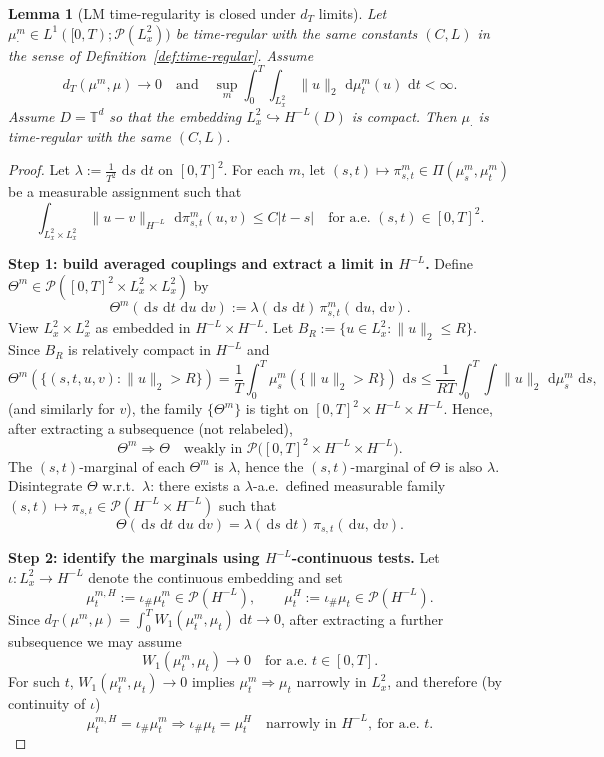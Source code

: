 \documentclass{article}
\numberwithin{equation}{section}
\theoremstyle{plain}
\newtheorem{lemma}[theorem]{Lemma}
\theoremstyle{definition}
\theoremstyle{remark}
\newcommand{\T}{\mathbb{T}}
\newcommand{\Pcal}{\mathcal{P}}
\newcommand{\dd}{\,\mathrm{d}}
\begin{document}
\begin{lemma}[LM time-regularity is closed under $d_T$ limits]
\label{lem:time-reg-closed}
Let $\mu^m_\cdot\in L^1([0,T);\Pcal(L^2_x))$ be time-regular with the same constants $(C,L)$ in the sense of
Definition~\ref{def:time-regular}. Assume
\[
d_T(\mu^m,\mu)\to 0
\quad\text{and}\quad
\sup_m\int_0^T\int_{L^2_x}\|u\|_2\,\dd\mu^m_t(u)\,\dd t<\infty.
\]
Assume $D=\T^d$ so that the embedding $L^2_x\hookrightarrow H^{-L}(D)$ is compact.
Then $\mu_\cdot$ is time-regular with the same $(C,L)$.
\end{lemma}

\begin{proof}
Let $\lambda:=\frac{1}{T^2}\,\dd s\,\dd t$ on $[0,T]^2$.
For each $m$, let $(s,t)\mapsto\pi^m_{s,t}\in\Pi(\mu^m_s,\mu^m_t)$ be a measurable assignment such that
\[
\int_{L^2_x\times L^2_x}\|u-v\|_{H^{-L}}\,\dd\pi^m_{s,t}(u,v)\le C|t-s|
\quad\text{for a.e.\ }(s,t)\in[0,T]^2.
\]

\smallskip
\noindent\textbf{Step 1: build averaged couplings and extract a limit in $H^{-L}$.}
Define $\Theta^m\in\Pcal([0,T]^2\times L^2_x\times L^2_x)$ by
\[
\Theta^m(\dd s\,\dd t\,\dd u\,\dd v)
:=\lambda(\dd s\,\dd t)\,\pi^m_{s,t}(\dd u,\dd v).
\]
View $L^2_x\times L^2_x$ as embedded in $H^{-L}\times H^{-L}$.
Let $B_R:=\{u\in L^2_x:\|u\|_2\le R\}$. Since $B_R$ is relatively compact in $H^{-L}$ and
\[
\Theta^m(\{(s,t,u,v):\|u\|_2>R\})
=\frac1T\int_0^T \mu^m_s(\{\|u\|_2>R\})\,\dd s
\le \frac{1}{RT}\int_0^T\int\|u\|_2\,\dd\mu^m_s\,\dd s,
\]
(and similarly for $v$), the family $\{\Theta^m\}$ is tight on $[0,T]^2\times H^{-L}\times H^{-L}$.
Hence, after extracting a subsequence (not relabeled),
\[
\Theta^m\Rightarrow\Theta
\quad\text{weakly in }\Pcal\big([0,T]^2\times H^{-L}\times H^{-L}\big).
\]
The $(s,t)$-marginal of each $\Theta^m$ is $\lambda$, hence the $(s,t)$-marginal of $\Theta$ is also $\lambda$.
Disintegrate $\Theta$ w.r.t.\ $\lambda$:
there exists a $\lambda$-a.e.\ defined measurable family $(s,t)\mapsto\pi_{s,t}\in\Pcal(H^{-L}\times H^{-L})$ such that
\[
\Theta(\dd s\,\dd t\,\dd u\,\dd v)=\lambda(\dd s\,\dd t)\,\pi_{s,t}(\dd u,\dd v).
\]

\smallskip
\noindent\textbf{Step 2: identify the marginals using $H^{-L}$-continuous tests.}
Let $\iota:L^2_x\to H^{-L}$ denote the continuous embedding and set
\[
\mu^{m,H}_t:=\iota_\#\mu^m_t\in\Pcal(H^{-L}),
\qquad
\mu^{H}_t:=\iota_\#\mu_t\in\Pcal(H^{-L}).
\]
Since $d_T(\mu^m,\mu)=\int_0^T W_1(\mu^m_t,\mu_t)\,\dd t\to0$, after extracting a further subsequence we may assume
\[
W_1(\mu^m_t,\mu_t)\to0 \quad\text{for a.e.\ }t\in[0,T].
\]
For such $t$, $W_1(\mu^m_t,\mu_t)\to0$ implies $\mu^m_t\Rightarrow\mu_t$ narrowly in $L^2_x$, and therefore (by continuity of $\iota$)
\[
\mu^{m,H}_t=\iota_\#\mu^m_t \Rightarrow \iota_\#\mu_t=\mu^H_t
\quad\text{narrowly in }H^{-L},\ \text{for a.e.\ }t.
\]


\end{proof}
\end{document}
